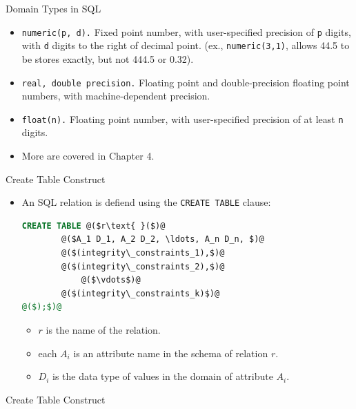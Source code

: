 \documentclass[aspectratio=169]{beamer}
\begin{document}
\begin{frame}{Domain Types in SQL}
    \begin{itemize}
        \item \texttt{numeric(p, d).} Fixed point number, with user-specified precision of \texttt{p} digits, with \texttt{d} digits to the right of decimal point. (ex., \texttt{numeric(3,1)}, allows 44.5 to be stores exactly, but not 444.5 or 0.32).
        \item \texttt{real, double precision.} Floating point and double-precision floating point numbers, with machine-dependent precision.
        \item \texttt{float(n).} Floating point number, with user-specified precision of at least \texttt{n} digits.
        \item More are covered in Chapter 4.
    \end{itemize}
\end{frame}

\begin{frame}[fragile]{Create Table Construct}
    \begin{itemize}
        \item An SQL relation is defiend using the \texttt{CREATE TABLE} clause:
        \begin{lstlisting}[language=SQL]
CREATE TABLE @($r\text{ }($)@
        @($A_1 D_1, A_2 D_2, \ldots, A_n D_n, $)@
        @($(integrity\_constraints_1),$)@
        @($(integrity\_constraints_2),$)@
            @($\vdots$)@
        @($(integrity\_constraints_k)$)@
@($);$)@
        \end{lstlisting}
        \begin{itemize}
            \item $r$ is the name of the relation.
            \item each $A_i$ is an attribute name in the schema of relation $r$.
            \item $D_i$ is the data type of values in the domain of attribute $A_i$.
        \end{itemize}
    \end{itemize}
\end{frame}

\begin{frame}[fragile]{Create Table Construct}
\end{frame}
\end{document}
